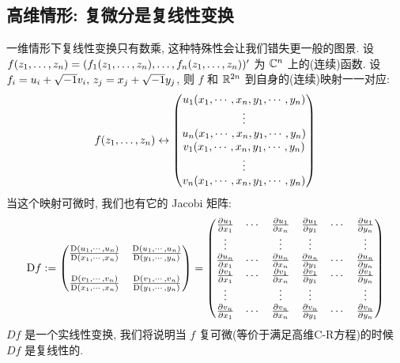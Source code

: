        \subsection{高维情形: 复微分是复线性变换}
            一维情形下复线性变换只有数乘, 这种特殊性会让我们错失更一般的图景. 
            设 $f({z}_{1},\dots,{z}_{n}) = (f_1({z}_{1},\dots,{z}_{n}),\dots,f_n({z}_{1},\dots,{z}_{n}))'$ 为 $\mathbb{C}^n$ 上的(连续)函数. 
            设 $f_i = u_i+\sqrt{-1} v_i,\,z_j = x_j+\sqrt{-1} y_j$, 则 $f$ 和 $\mathbb{R}^{2n}$ 到自身的(连续)映射一一对应:
            \begin{equation*}
                f({z}_{1},\dots,{z}_{n})\leftrightarrow
                \begin{pmatrix}
                    u_1({x}_{1},\cdots,{x}_{n},{y}_{1},\cdots,{y}_{n}) \\
                    \vdots \\
                    u_n({x}_{1},\cdots,{x}_{n},{y}_{1},\cdots,{y}_{n}) \\
                    v_1({x}_{1},\cdots,{x}_{n},{y}_{1},\cdots,{y}_{n}) \\
                    \vdots \\
                    v_n({x}_{1},\cdots,{x}_{n},{y}_{1},\cdots,{y}_{n}) \\
                \end{pmatrix}
            \end{equation*}
            当这个映射可微时, 我们也有它的 Jacobi 矩阵:
            \begin{equation*}
                {\rm D}f := 
                \begin{pmatrix}
                    \frac{{\rm D}({u}_{1},\cdots,{u}_{n})}{{\rm D}({x}_{1},\cdots,{x}_{n})} & \frac{{\rm D}({u}_{1},\cdots,{u}_{n})}{{\rm D}({y}_{1},\cdots,{y}_{n})} \\ \\
                    \frac{{\rm D}({v}_{1},\cdots,{v}_{n})}{{\rm D}({x}_{1},\cdots,{x}_{n})} & \frac{{\rm D}({v}_{1},\cdots,{v}_{n})}{{\rm D}({y}_{1},\cdots,{y}_{n})}
                \end{pmatrix} = 
                \begin{pmatrix}
                    \frac{\partial u_1}{\partial x_1}   &   \cdots  &   \frac{\partial u_1}{\partial x_n}   &   \frac{\partial u_1}{\partial y_1}   &   \cdots  &   \frac{\partial u_1}{\partial y_n}   \\
                    \vdots          &           &   \vdots          &   \vdots          &           &   \vdots          \\
                    \frac{\partial u_n}{\partial x_1}   &   \cdots  &   \frac{\partial u_n}{\partial x_n}   &   \frac{\partial u_n}{\partial y_1}   &   \cdots  &   \frac{\partial u_n}{\partial y_n}   \\
                    \frac{\partial v_1}{\partial x_1}   &   \cdots  &   \frac{\partial v_1}{\partial x_n}   &   \frac{\partial v_1}{\partial y_1}   &   \cdots  &   \frac{\partial v_1}{\partial y_n}   \\
                    \vdots          &           &   \vdots          &   \vdots          &           &   \vdots          \\
                    \frac{\partial v_n}{\partial x_1}   &   \cdots  &   \frac{\partial v_n}{\partial x_n}   &   \frac{\partial v_n}{\partial y_1}   &   \cdots  &   \frac{\partial v_n}{\partial y_n}   \\
                \end{pmatrix}
            \end{equation*}
            $Df$ 是一个实线性变换, 我们将说明当 $f$ 复可微(等价于满足高维C-R方程)的时候 $Df$ 是复线性的.

